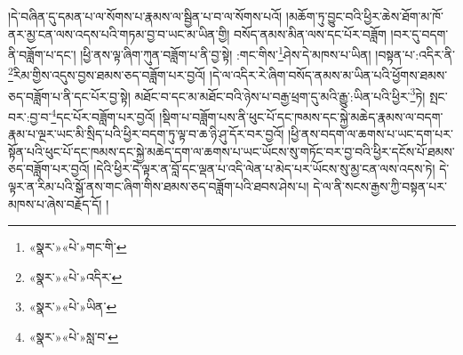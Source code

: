 །དེ་བཞིན་དུ་དམན་པ་ལ་སོགས་པ་རྣམས་ལ་སྦྱིན་པ་བ་ལ་སོགས་པའོ། །མཆོག་ཏུ་བྱུང་བའི་ཕྱིར་ཆེས་ཐོག་མ་ཁོ་ནར་མྱ་ངན་ལས་འདས་པའི་གཏམ་བྱ་བ་ཡང་མ་ཡིན་གྱི། བསོད་ནམས་མིན་ལས་དང་པོར་བཟློག །བར་དུ་བདག་ནི་བཟློག་པ་དང་། །ཕྱི་ནས་ལྟ་ཞིག་ཀུན་བཟློག་པ་ནི་བྱ་སྟེ། :གང་གིས་\footnote{«སྣར་»«པེ་»གང་གི་}ཤེས་དེ་མཁས་པ་ཡིན། །བསྟན་པ་:འདིར་ནི་\footnote{«སྣར་»«པེ་»འདིར་}རིམ་གྱིས་འདུས་བྱས་ཐམས་ཅད་བཟློག་པར་བྱའོ། །དེ་ལ་འདིར་རེ་ཞིག་བསོད་ནམས་མ་ཡིན་པའི་ཕྱོགས་ཐམས་ཅད་བཟློག་པ་ནི་དང་པོར་བྱ་སྟེ། མཐོང་བ་དང་མ་མཐོང་བའི་ཉེས་པ་བརྒྱ་ཕྲག་དུ་མའི་རྒྱུ་:ཡིན་པའི་ཕྱིར་\footnote{«སྣར་»«པེ་»ཡིན་}ཏེ། སྤང་བར་:བྱ་བ་\footnote{«སྣར་»«པེ་»སླ་བ་}དང་པོར་བཟློག་པར་བྱའོ། །སྡིག་པ་བཟློག་པས་ནི་ཕུང་པོ་དང་ཁམས་དང་སྐྱེ་མཆེད་རྣམས་ལ་བདག་རྣམ་པ་ལྔར་ཡང་མི་སྲིད་པའི་ཕྱིར་བདག་ཏུ་ལྟ་བ་ཆ་ཉི་ཤུ་དོར་བར་བྱའོ། །ཕྱི་ནས་བདག་ལ་ཆགས་པ་ཡང་དག་པར་སྟོན་པའི་ཕུང་པོ་དང་ཁམས་དང་སྐྱེ་མཆེད་དག་ལ་ཆགས་པ་ཡང་ཡོངས་སུ་གཏོང་བར་བྱ་བའི་ཕྱིར་དངོས་པོ་ཐམས་ཅད་བཟློག་པར་བྱའོ། །དེའི་ཕྱིར་དེ་ལྟར་ན་བློ་དང་ལྡན་པ་འདི་ལེན་པ་མེད་པར་ཡོངས་སུ་མྱ་ངན་ལས་འདས་ཏེ། དེ་ལྟར་ན་རིམ་པའི་སྒོ་ནས་གང་ཞིག་གིས་ཐམས་ཅད་བཟློག་པའི་ཐབས་ཤེས་པ། དེ་ལ་ནི་སངས་རྒྱས་ཀྱི་བསྟན་པར་མཁས་པ་ཞེས་བརྗོད་དོ། །
